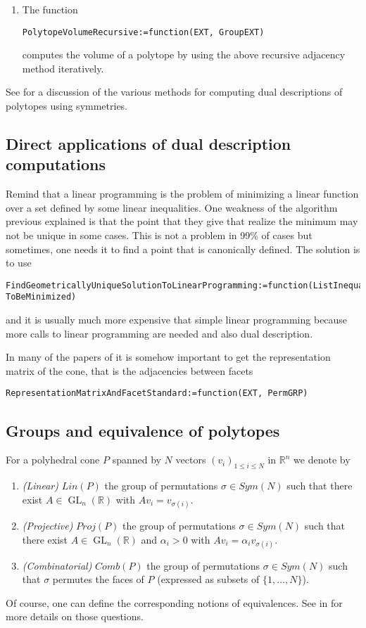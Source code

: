 \documentclass[12pt]{amsart}
\newcommand{\RR}{\ensuremath{\mathbb{R}}}
\DeclareMathOperator{\GL}{GL}
\begin{document}
\begin{enumerate}
\item The function
\begin{verbatim}
PolytopeVolumeRecursive:=function(EXT, GroupEXT)
\end{verbatim}
computes the volume of a polytope by using the above recursive
adjacency method iteratively.


\end{enumerate}
See \cite{symsurvey} for a discussion of the various methods for
computing dual descriptions of polytopes using symmetries.


\subsection{Direct applications of dual description computations}

Remind that a linear programming is the problem of minimizing a 
linear function over a set defined by some linear inequalities.
One weakness of the algorithm previous explained is that the point
that they give that realize the minimum may not be unique in some
cases.
This is not a problem in 99\% of cases but sometimes, one needs
it to find a point that is canonically defined.
The solution is to use
\begin{verbatim}
FindGeometricallyUniqueSolutionToLinearProgramming:=function(ListInequalities, ToBeMinimized)
\end{verbatim}
and it is usually much more expensive that simple linear programming
because more calls to linear programming are needed and also dual
description.

In many of the papers of \cite{mining} it is somehow important to get
the representation matrix of the cone, that is the adjacencies
between facets
\begin{verbatim}
RepresentationMatrixAndFacetStandard:=function(EXT, PermGRP)
\end{verbatim}



\subsection{Groups and equivalence of polytopes}

For a polyhedral cone $P$ spanned by $N$ vectors $(v_i)_{1\leq i\leq N}$
in $\RR^n$ we denote by
\begin{enumerate}
\item {\it (Linear)} $Lin(P)$ the group of permutations $\sigma\in Sym(N)$
such that there exist $A\in \GL_n(\RR)$ with $Av_i = v_{\sigma(i)}$.
\item {\it (Projective)} $Proj(P)$ the group of permutations $\sigma\in Sym(N)$
such that there exist $A\in \GL_n(\RR)$ and $\alpha_i>0$
with $Av_i = \alpha_i v_{\sigma(i)}$.
\item {\it (Combinatorial)} $Comb(P)$ the group of permutations
$\sigma\in Sym(N)$ such that $\sigma$ permutes the faces of $P$
(expressed as subsets of $\{1,\dots, N\}$).
\end{enumerate}
Of course, one can define the corresponding notions of equivalences.
See in \cite{CombProjLin} for more details on those questions.
\end{document}
